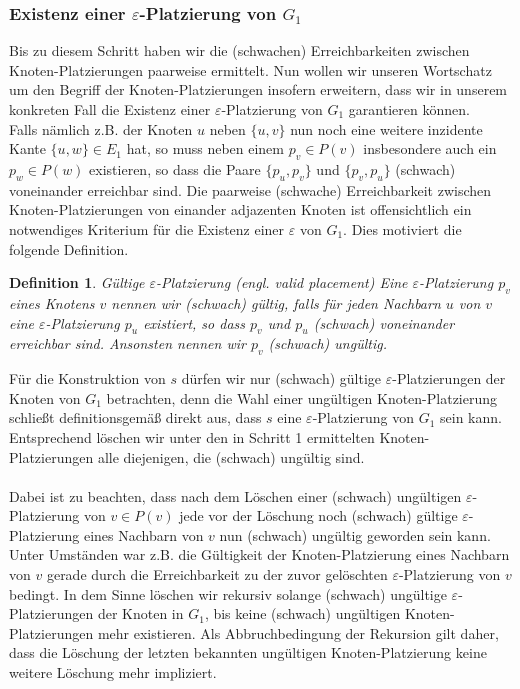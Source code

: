 \documentclass[a4paper, 12pt, twoside]{article}
\theoremstyle{Format1} %
\newtheorem{Def}{Definition}[section]       %
\begin{document}
\subsubsection{Existenz einer $\varepsilon$-Platzierung von $G_1$}
Bis zu diesem Schritt haben wir die (schwachen) Erreichbarkeiten zwischen Knoten-Platzierungen paarweise ermittelt.
Nun wollen wir unseren Wortschatz um den Begriff der Knoten-Platzierungen insofern erweitern, dass wir in unserem konkreten Fall die Existenz einer
$\varepsilon$-Platzierung von $G_1$ garantieren können.
\\
Falls nämlich z.B. der Knoten $u$ neben $\{u,v\}$ nun noch eine weitere inzidente Kante $\{u,w\} \in E_1$ hat, so muss neben einem $p_v \in P(v)$ insbesondere auch
ein $p_w \in P(w)$ existieren, so dass die Paare $\{p_u,p_v\}$ und $\{p_v,p_u\}$ (schwach) voneinander erreichbar sind. Die paarweise (schwache) Erreichbarkeit
zwischen Knoten-Platzierungen von einander adjazenten Knoten ist offensichtlich ein notwendiges Kriterium für die Existenz einer $\varepsilon$ von $G_1$.
Dies motiviert die folgende Definition.

\begin{Def}
	Gültige $\varepsilon$-Platzierung (engl. valid placement)
	Eine $\varepsilon$-Platzierung $p_v$ eines Knotens $v$ nennen wir (schwach) \textit{gültig}, falls für jeden Nachbarn $u$ von $v$
	eine $\varepsilon$-Platzierung $p_u$ existiert, so dass $p_v$ und $p_u$ (schwach) voneinander erreichbar sind.
	Ansonsten nennen wir $p_v$ (schwach) ungültig.
\end{Def}

Für die Konstruktion von $s$ dürfen wir nur (schwach) gültige $\varepsilon$-Platzierungen der Knoten von $G_1$ betrachten, denn die
Wahl einer ungültigen Knoten-Platzierung schließt definitionsgemäß direkt aus, dass $s$ eine $\varepsilon$-Platzierung von $G_1$ sein kann.
Entsprechend löschen wir unter den in Schritt 1 ermittelten Knoten-Platzierungen alle diejenigen, die (schwach) ungültig sind.
\\
\\
Dabei ist zu beachten, dass nach dem Löschen einer (schwach) ungültigen $\varepsilon$-Platzierung von $v \in P(v)$
jede vor der Löschung noch (schwach) gültige $\varepsilon$-Platzierung eines Nachbarn von $v$ nun (schwach) ungültig geworden sein kann.
Unter Umständen war z.B. die Gültigkeit der Knoten-Platzierung eines Nachbarn von $v$ gerade durch die Erreichbarkeit zu der zuvor gelöschten
$\varepsilon$-Platzierung von $v$ bedingt.
In dem Sinne löschen wir rekursiv solange (schwach) ungültige $\varepsilon$-Platzierungen der Knoten in $G_1$, bis
keine (schwach) ungültigen Knoten-Platzierungen mehr existieren. Als Abbruchbedingung der Rekursion gilt daher, dass die Löschung der letzten bekannten
ungültigen Knoten-Platzierung keine weitere Löschung mehr impliziert.
\end{document}
